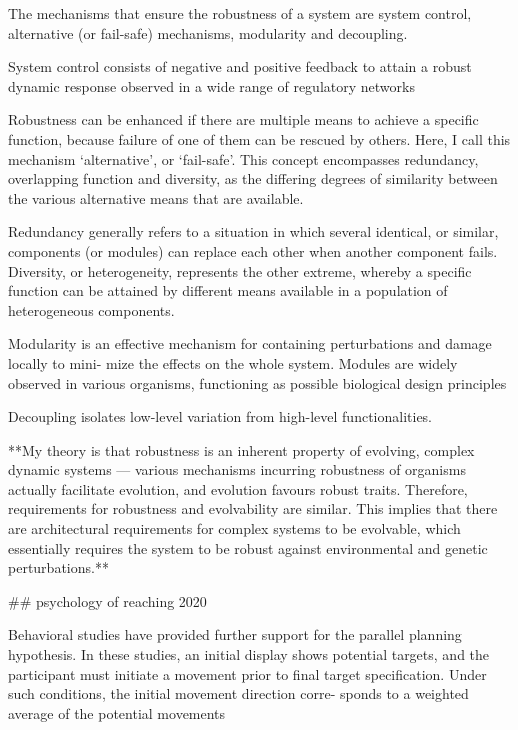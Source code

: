\documentclass[../main.tex]{subfiles}
\begin{document}
{{{The mechanisms that ensure the robustness of a system are system control, alternative (or fail-safe) mechanisms, modularity and decoupling.

System control consists of negative and positive feedback to attain a robust dynamic response observed in a wide range of regulatory networks

Robustness can be enhanced if there are multiple means to achieve a specific function, because failure of one of them can be rescued by others. Here, I call this mechanism ‘alternative’, or ‘fail-safe’. This concept encompasses redundancy, overlapping function and diversity, as the differing degrees of similarity between the various alternative means that are available.

Redundancy generally refers to a situation in which several identical, or similar, components (or modules) can replace each other when another component fails. Diversity, or heterogeneity, represents the other extreme, whereby a specific function can be attained by different means available in a population of heterogeneous components. 

Modularity is an effective mechanism for containing perturbations and damage locally to mini- mize the effects on the whole system. Modules are widely observed in various organisms, functioning as possible biological design principles

Decoupling isolates low-level variation from high-level functionalities.

**My theory is that robustness is an inherent property of evolving, complex dynamic systems — various mechanisms incurring robustness of organisms actually facilitate evolution, and evolution favours robust traits. Therefore, requirements for robustness and evolvability are similar. This implies that there are architectural requirements for complex systems to be evolvable, which essentially requires the system to be robust against environmental and genetic perturbations.**





## psychology of reaching 2020

Behavioral studies have provided further support for the parallel planning hypothesis. In these studies, an initial display shows potential targets, and the participant must initiate a movement prior to final target specification. Under such conditions, the initial movement direction corre- sponds to a weighted average of the potential movements

}}}
\end{document}
